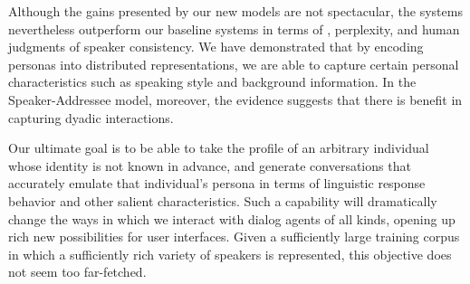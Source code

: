 Although the gains presented by our new models are not spectacular, the systems nevertheless outperform our baseline \sts systems in terms of \bleu, perplexity, and human judgments of speaker consistency. 
We have demonstrated that by encoding personas into distributed representations, we are able
to capture certain personal characteristics such as speaking style and background information. 
In the Speaker-Addressee model, moreover, the evidence suggests that there is benefit in capturing dyadic interactions. 

Our ultimate goal is to be able to take the profile of an arbitrary individual whose identity is not known in advance, and generate conversations that accurately emulate that individual's persona in terms of linguistic response behavior and other salient characteristics. 
Such a capability will dramatically change the ways in which we interact with dialog agents of all kinds, opening up rich new possibilities for user interfaces. 
Given a sufficiently large training corpus in which a sufficiently rich variety of speakers is represented, this objective does not seem too far-fetched.





